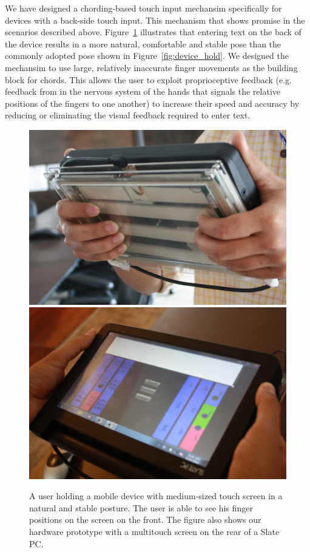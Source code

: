 We have designed a chording-based touch input mechansim specifically
for devices with a back-side touch input.  This mechanism that shows
promise in the scenarios described above.  Figure~\ref{fig:natural}
illustrates that entering text on the back of the device results in a
more natural, comfortable and stable pose than the commonly adopted
pose shown in Figure~\ref{fig:device_hold}.  We designed the mechansim
to use large, relatively inaccurate finger movements as the building
block for chords.  This allows the user to exploit proprioceptive
feedback (e.g. feedback from in the nervous system of the hands that
signals the relative positions of the fingers to one another) to
increase their speed and accuracy by reducing or eliminating the
visual feedback required to enter text.

\begin{figure}
    \includegraphics[scale=0.43]{Figures/natural1.pdf} 
     \includegraphics[scale=0.43]{Figures/natural2.pdf} 
     \caption{A user holding a mobile device with medium-sized touch
       screen in a natural and stable posture. The user is able to see
       his finger positions on the screen on the front. The figure
       also shows our hardware prototype with a multitouch screen on
       the rear of a Slate PC.}
        \label{fig:natural}
\end{figure}

